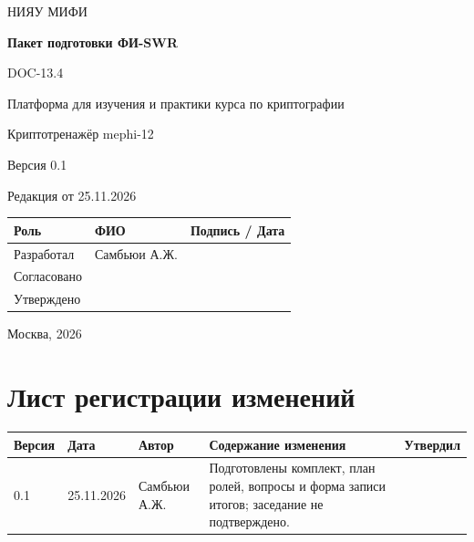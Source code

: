 \documentclass[12pt,a4paper]{article}
\begin{document}
\hypersetup{pageanchor=false}
\begin{titlepage}
  \thispagestyle{empty}
  \centering
  {\large НИЯУ МИФИ\par}
  \vspace*{3.5cm}
  {\LARGE\bfseries Пакет подготовки ФИ-SWR\par}
  \vspace{0.5cm}
  {\large DOC-13.4\par}
  \vspace{0.6cm}
  {\large Платформа для изучения и практики курса по криптографии\par}
  {\large Криптотренажёр mephi-12\par}
  \vspace{0.7cm}
  {\large Версия 0.1\par}
  {\large Редакция от 25.11.2026\par}
  \vspace{1cm}
  \begin{tabularx}{\textwidth}{@{}p{3.4cm}Xp{4cm}@{}}
    \toprule
    Роль & ФИО & Подпись / Дата \\
    \midrule
    Разработал & Самбьюи А.Ж. & \\
    \addlinespace[6pt]
    Согласовано & & \\
    \addlinespace[6pt]
    Утверждено & & \\
    \bottomrule
  \end{tabularx}
  \vfill
  {\large Москва, 2026\par}
\end{titlepage}
\hypersetup{pageanchor=true}

\section*{Лист регистрации изменений}
\begingroup\small\singlespacing
\noindent
\begin{tabularx}{\textwidth}{@{}p{1.2cm}p{2cm}p{2.5cm}Xp{1.8cm}@{}}
\toprule
Версия & Дата & Автор & Содержание изменения & Утвердил \\
\midrule
0.1 & 25.11.2026 & Самбьюи А.Ж. & Подготовлены комплект, план ролей, вопросы и форма записи итогов; заседание не подтверждено. & \\
\bottomrule
\end{tabularx}
\endgroup
\clearpage
\begingroup\small\singlespacing
\tableofcontents
\endgroup
\clearpage

\hypertarget{doc-134-пакет-подготовки-фи-swr}{}
\end{document}
